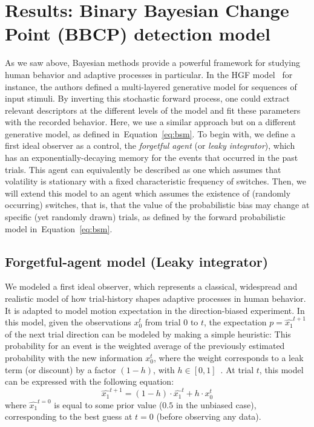 \documentclass[12pt,english]{article}%
\newcommand{\eql}[1]{\begin{equation}#1\end{equation}}
\newcommand{\citep}[1]{\parencite{#1}}
\newcommand{\seeEq}[1]{Equation~\ref{eq:#1}}
\begin{document}
\section{Results: Binary Bayesian Change Point (BBCP) detection model}
\label{sec:bayesian_change_point}
%
%
As we saw above, Bayesian methods provide a powerful framework for studying human behavior and adaptive  processes in particular.
In the HGF model~\citep{Mathys11} for instance, the
authors defined a multi-layered generative model for
sequences of input stimuli.
By inverting this stochastic forward process,
one could extract relevant descriptors at the different levels of the model
and fit these parameters with the recorded behavior.
Here, we use a similar approach but on a different generative model,
as defined in~\seeEq{bsm}.
To begin with, we define a first ideal observer as a control, the \textit{forgetful agent} (or \textit{leaky integrator}), 
which has an exponentially-decaying memory for the events that occurred in the past trials. 
This agent can equivalently be described as one
which assumes that volatility is stationary with a fixed characteristic frequency of switches.
Then, we will extend this model to an agent
which assumes the existence of (randomly occurring) switches, that is,
that the value of the probabilistic bias may change
at specific (yet randomly drawn) trials,
as defined by the forward probabilistic model in~\seeEq{bsm}.
%
\subsection{Forgetful-agent model (Leaky integrator)}%
We modeled a first ideal observer,
which represents a classical, widespread and
realistic model of how trial-history shapes
adaptive processes in human behavior.
It is adapted to model motion expectation in the direction-biased experiment.
In this model, given the observations $x_0^t$ from trial $0$ to $t$,
the expectation $p=\hat{x_1}^{t+1}$ of the next trial direction can be modeled by making a simple heuristic:
This probability for an event is the weighted average of
the previously estimated probability with the new information $x_0^t$,
where the weight corresponds to a leak term (or discount)
by a factor $(1 - h)$, with $h \in [0, 1]$~\citep{Anderson2006}.
At trial $t$, this model can be expressed with the following equation:
\eql{
\hat{x_1}^{t+1} = (1 - h) \cdot \hat{x_1}^{t} + h \cdot x_0^t
\label{eq:leaky}}
where $\hat{x_1}^{t=0}$ is equal to some prior value ($0.5$ in the unbiased case),
corresponding to the best guess at $t=0$ (before observing any data).
\end{document}
